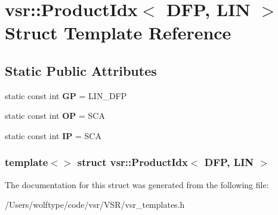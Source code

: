 \hypertarget{structvsr_1_1_product_idx_3_01_d_f_p_00_01_l_i_n_01_4}{\section{vsr\-:\-:Product\-Idx$<$ D\-F\-P, L\-I\-N $>$ Struct Template Reference}
\label{structvsr_1_1_product_idx_3_01_d_f_p_00_01_l_i_n_01_4}
}
\subsection*{Static Public Attributes}
\begin{DoxyCompactItemize}
\item 
\hypertarget{structvsr_1_1_product_idx_3_01_d_f_p_00_01_l_i_n_01_4_ad13f65601a87d2df7a9d4fec24d8b618}{static const int {\bfseries G\-P} = L\-I\-N\-\_\-\-D\-F\-P}\label{structvsr_1_1_product_idx_3_01_d_f_p_00_01_l_i_n_01_4_ad13f65601a87d2df7a9d4fec24d8b618}

\item 
\hypertarget{structvsr_1_1_product_idx_3_01_d_f_p_00_01_l_i_n_01_4_adbdc546eb8f015c7b645473ad0f9c5a9}{static const int {\bfseries O\-P} = S\-C\-A}\label{structvsr_1_1_product_idx_3_01_d_f_p_00_01_l_i_n_01_4_adbdc546eb8f015c7b645473ad0f9c5a9}

\item 
\hypertarget{structvsr_1_1_product_idx_3_01_d_f_p_00_01_l_i_n_01_4_ab89ff9f5961c707b48d53028ae38fc25}{static const int {\bfseries I\-P} = S\-C\-A}\label{structvsr_1_1_product_idx_3_01_d_f_p_00_01_l_i_n_01_4_ab89ff9f5961c707b48d53028ae38fc25}

\end{DoxyCompactItemize}
\subsubsection*{template$<$$>$ struct vsr\-::\-Product\-Idx$<$ D\-F\-P, L\-I\-N $>$}



The documentation for this struct was generated from the following file\-:\begin{DoxyCompactItemize}
\item 
/\-Users/wolftype/code/vsr/\-V\-S\-R/vsr\-\_\-templates.\-h\end{DoxyCompactItemize}
